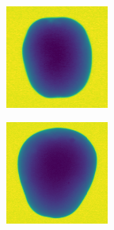 \documentclass[11pt]{article}
\begin{document}
\begin{figure}[!h]
\begin{subfigure}[b]{0.22\textwidth}
         \caption{}
         \label{fig:perfect_11}
     \end{subfigure}
          \\
    \begin{subfigure}[b]{0.22\textwidth}
         \centering
         \includegraphics[width=\textwidth]{figurer/potato_dataset/perfect/perfect_12.jpg}
         \caption{}
         \label{fig:perfect_12}
     \end{subfigure}
     \hfill
     \begin{subfigure}[b]{0.22\textwidth}
         \centering
         \includegraphics[width=\textwidth]{figurer/potato_dataset/perfect/perfect_13.jpg}

\end{subfigure}
\end{figure}
\end{document}
